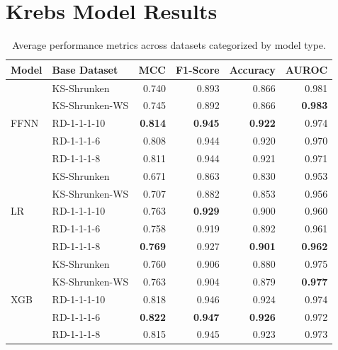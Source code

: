 \section{Krebs Model Results}
\label{sec:krebs_model_results}

\begin{table}[ht]
	\centering
	\small
	\begin{tabular}{llrrrr}
		\toprule
		Model                    & Base Dataset   & MCC            & F1-Score       & Accuracy       & AUROC          \\
		\midrule
		\multirow[t]{5}{*}{FFNN} & KS-Shrunken    & 0.740          & 0.893          & 0.866          & 0.981          \\
		                         & KS-Shrunken-WS & 0.745          & 0.892          & 0.866          & \textbf{0.983} \\
		                         & RD-1-1-1-10    & \textbf{0.814} & \textbf{0.945} & \textbf{0.922} & 0.974          \\
		                         & RD-1-1-1-6     & 0.808          & 0.944          & 0.920          & 0.970          \\
		                         & RD-1-1-1-8     & 0.811          & 0.944          & 0.921          & 0.971          \\\midrule
		\multirow[t]{5}{*}{LR}   & KS-Shrunken    & 0.671          & 0.863          & 0.830          & 0.953          \\
		                         & KS-Shrunken-WS & 0.707          & 0.882          & 0.853          & 0.956          \\
		                         & RD-1-1-1-10    & 0.763          & \textbf{0.929} & 0.900          & 0.960          \\
		                         & RD-1-1-1-6     & 0.758          & 0.919          & 0.892          & 0.961          \\
		                         & RD-1-1-1-8     & \textbf{0.769} & 0.927          & \textbf{0.901} & \textbf{0.962} \\\midrule
		\multirow[t]{5}{*}{XGB}  & KS-Shrunken    & 0.760          & 0.906          & 0.880          & 0.975          \\
		                         & KS-Shrunken-WS & 0.763          & 0.904          & 0.879          & \textbf{0.977} \\
		                         & RD-1-1-1-10    & 0.818          & 0.946          & 0.924          & 0.974          \\
		                         & RD-1-1-1-6     & \textbf{0.822} & \textbf{0.947} & \textbf{0.926} & 0.972          \\
		                         & RD-1-1-1-8     & 0.815          & 0.945          & 0.923          & 0.973          \\
		\bottomrule
	\end{tabular}
	\caption{Average performance metrics across \krebsADataSetText datasets categorized by model type.}
	\label{tab:mdoe_performance_krebs_model_type}
\end{table}

